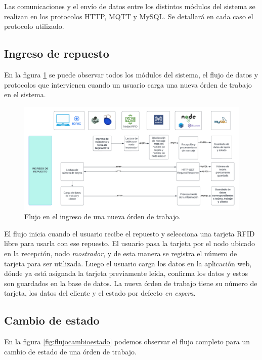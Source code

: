 Las comunicaciones y el envío de datos entre los distintos módulos del sistema se realizan en los protocolos HTTP, MQTT y MySQL. Se detallará en cada caso el protocolo utilizado.

\subsection{Ingreso de repuesto}
\label{subsec:ingresorepuesto}
En la figura \ref{fig:flujoingreso} se puede observar todos los módulos del sistema, el flujo de datos y protocolos que intervienen cuando un usuario carga una nueva órden de trabajo en el sistema.

\begin{figure}[ht]
	\centering
	\includegraphics[scale=.20]{./Figures/flujoingreso.png}
	\caption{Flujo en el ingreso de una nueva órden de trabajo.}
	\label{fig:flujoingreso}
\end{figure}
  
El flujo inicia cuando el usuario recibe el repuesto y selecciona una tarjeta RFID libre para usarla con ese repuesto. El usuario pasa la tarjeta por el nodo ubicado en la recepción, nodo \textit{mostrador}, y de esta manera se registra el número de tarjeta para ser utilizada. Luego el usuario carga los datos en la aplicación web, dónde ya está asignada la tarjeta previamente leída, confirma los datos y estos son guardados en la base de datos. La nueva órden de trabajo tiene su número de tarjeta, los datos del cliente y el estado por defecto \textit{en espera}.

\subsection{Cambio de estado}
\label{subsec:flujocambioestado}

En la figura \ref{fig:flujocambioestado} podemos observar el flujo completo para un cambio de estado de una órden de trabajo.

